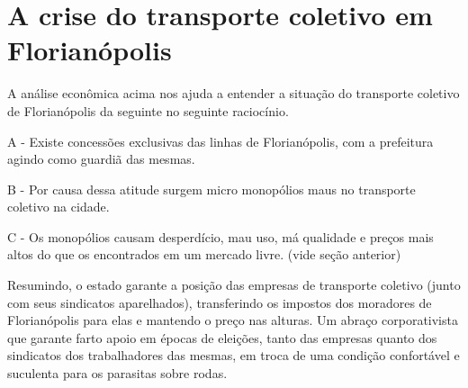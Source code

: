 \section{A crise do transporte coletivo em Florianópolis}

A análise econômica acima nos ajuda a entender a situação do
transporte coletivo de Florianópolis da seguinte no seguinte
raciocínio.

A - Existe concessões exclusivas das linhas de Florianópolis, com a
prefeitura agindo como guardiã das mesmas.

B - Por causa dessa atitude surgem micro monopólios maus no transporte
coletivo na cidade.

C - Os monopólios causam desperdício, mau uso, má qualidade e preços
mais altos do que os encontrados em um mercado livre. (vide seção
anterior)

Resumindo, o estado garante a posição das empresas de transporte
coletivo (junto com seus sindicatos aparelhados), transferindo os
impostos dos moradores de Florianópolis para elas e mantendo o preço
nas alturas. Um abraço corporativista que garante farto apoio em
épocas de eleições, tanto das empresas quanto dos sindicatos dos
trabalhadores das mesmas, em troca de uma condição confortável e
suculenta para os parasitas sobre rodas.

